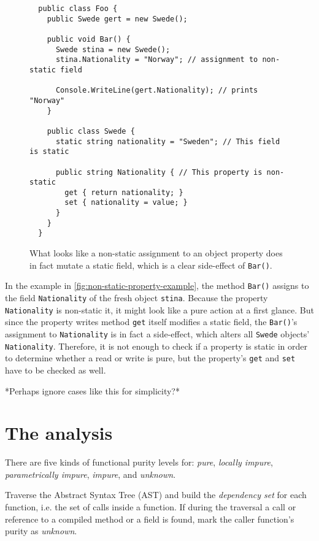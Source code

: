 \documentclass[a4paper,12pt]{article}
\begin{document}
\begin{figure}[H]
  \centering
  \begin{lstlisting}
  public class Foo {
    public Swede gert = new Swede();

    public void Bar() {
      Swede stina = new Swede();
      stina.Nationality = "Norway"; // assignment to non-static field

      Console.WriteLine(gert.Nationality); // prints "Norway"
    }

    public class Swede {
      static string nationality = "Sweden"; // This field is static

      public string Nationality { // This property is non-static
        get { return nationality; }
        set { nationality = value; }
      }
    }
  }
  \end{lstlisting}
  \caption{What looks like a non-static assignment to an object property does in fact mutate a static field, which is a clear side-effect of \texttt{Bar()}.}
  \label{fig:non-static-property-example}
\end{figure}

In the example in \autoref{fig:non-static-property-example}, the method \texttt{Bar()} assigns to the field \texttt{Nationality} of the fresh object \texttt{stina}. Because the property \texttt{Nationality} is non-static it, it might look like a pure action at a first glance. But since the property writes method \texttt{get} itself modifies a static field, the \texttt{Bar()}'s assignment to \texttt{Nationality} is in fact a side-effect, which alters all \texttt{Swede} objects' \texttt{Nationality}. Therefore, it is not enough to check if a property is static in order to determine whether a read or write is pure, but the property's \texttt{get} and \texttt{set} have to be checked as well.

*Perhaps ignore cases like this for simplicity?*

\section{The analysis} \label{sub:Analysis}
There are five kinds of functional purity levels for: \textit{pure}, \textit{locally impure}, \textit{parametrically impure}, \textit{impure}, and \textit{unknown}.

Traverse the Abstract Syntax Tree (AST) and build the \textit{dependency set} for each function, i.e. the set of calls inside a function. If during the traversal a call or reference to a compiled method or a field is found, mark the caller function's purity as \textit{unknown}.
\end{document}
